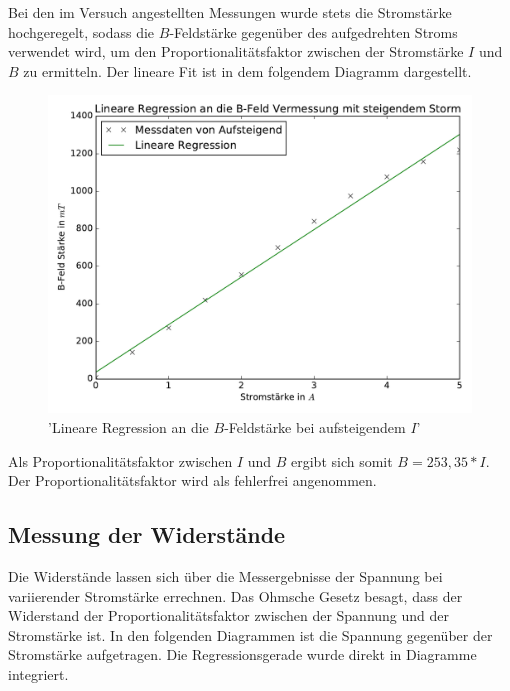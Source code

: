 Bei den im Versuch angestellten Messungen wurde stets die Stromstärke hochgeregelt,
sodass die $B$-Feldstärke gegenüber des aufgedrehten Stroms verwendet wird, um
den Proportionalitätsfaktor zwischen der Stromstärke $I$ und $B$ zu ermitteln.
Der lineare Fit ist in dem folgendem Diagramm dargestellt.

\begin{figure}
  \includegraphics[width=\textwidth]{lineareRegression.pdf}
  \caption{'Lineare Regression an die $B$-Feldstärke bei aufsteigendem $I$'}
  \label{fig:lineareRegression}
\end{figure}

Als Proportionalitätsfaktor zwischen $I$ und $B$ ergibt sich somit $B =
253,35 * I$. Der Proportionalitätsfaktor wird als fehlerfrei angenommen.

\subsection{Messung der Widerstände}

Die Widerstände lassen sich über die Messergebnisse der Spannung bei variierender
Stromstärke errechnen. Das Ohmsche Gesetz besagt, dass der Widerstand der
Proportionalitätsfaktor zwischen der Spannung und der Stromstärke ist.
In den folgenden Diagrammen ist die Spannung gegenüber der Stromstärke aufgetragen.
Die Regressionsgerade wurde direkt in Diagramme integriert.

